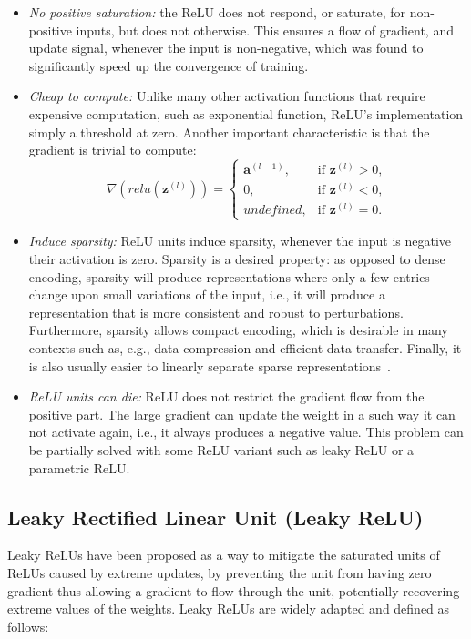 \begin{itemize}
    \item \emph{No positive saturation:} the ReLU does not respond, or saturate, for non-positive inputs, but does not otherwise. This ensures a flow of gradient, and update signal, whenever the input is non-negative, which was found to significantly speed up the convergence of training.
    \item \emph{Cheap to compute:} Unlike many other activation functions that require expensive computation, such as exponential function, ReLU's implementation simply a threshold at zero. Another important characteristic is that the gradient is trivial to compute:
        \begin{equation}\label{eq:relu_derivative}
            \nabla (relu(\mathbf{z}^{(l)})) =
                \begin{cases}
                    \mathbf{a}^{(l-1)},  & \text{if } \mathbf{z}^{(l)} > 0 ,\\
                    0,          & \text{if } \mathbf{z}^{(l)} < 0 ,\\
                    undefined,  & \text{if } \mathbf{z}^{(l)} = 0.
                \end{cases}
        \end{equation}

    \item \emph{Induce sparsity:} ReLU units induce sparsity, whenever the input is negative their activation is zero. Sparsity is a desired property: as opposed to dense encoding, sparsity will produce representations where only a few entries change upon small variations of the input, i.e., it will produce a representation that is more consistent and robust to perturbations. Furthermore, sparsity allows compact encoding, which is desirable in many contexts such as, e.g., data compression and efficient data transfer.  Finally, it is also usually easier to linearly separate sparse representations~\cite{GlorotDeep2011}.
    \item \emph{ReLU units can die:} 
    ReLU does not restrict the gradient flow from the positive part. The large gradient can update the weight in a such way it can not activate again, i.e., it always produces a negative value. This problem can be partially solved with some ReLU variant such as leaky ReLU or a parametric ReLU.  
\end{itemize}

\subsection{Leaky Rectified Linear Unit (Leaky ReLU)}\label{sec:lrelu}
Leaky ReLUs have been proposed as a way to mitigate the saturated units of ReLUs caused by extreme updates, by preventing the unit from having zero gradient thus allowing a  gradient to flow through the unit, potentially recovering extreme values of the weights. Leaky ReLUs are widely adapted and defined as follows:

